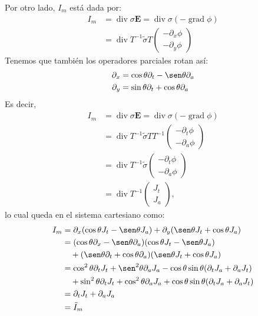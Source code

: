 \documentclass{article}
\newcommand{\EF}{\mathbf{E}}
\DeclareMathOperator{\diver}{div}
\DeclareMathOperator{\grad}{grad}
\begin{document}
Por otro lado, $I_m$ está dada por:
\begin{equation}
\begin{split}
I_m& =\diver \sigma \EF = \diver \sigma (-\grad \phi)\\
& = \diver T^{-1}\tilde{\sigma} T 
\begin{pmatrix}
- \partial_x \phi \\
- \partial_y \phi 
\end{pmatrix}
\end{split}
\end{equation}
Tenemos que también los operadores parciales rotan así:
\begin{align}
\partial_x & =\cos\theta\partial _t - \sen\theta\partial_a \\
\partial_y & =\sin\theta\partial _t +\cos\theta\partial_a
\end{align}
Es decir,
\begin{equation}
\begin{split}
I_m& =\diver \sigma \EF = \diver \sigma (-\grad \phi)\\
& = \diver T^{-1}\tilde{\sigma} T T^{-1} \begin{pmatrix}
-\partial _t \phi\\
-\partial_a \phi
\end{pmatrix}\\
&  = \diver T^{-1}\tilde{\sigma} \begin{pmatrix}
-\partial _t \phi\\
-\partial_a \phi
\end{pmatrix}\\
&  = \diver T^{-1} \begin{pmatrix}
J_t\\
J_a
\end{pmatrix},
\end{split}
\end{equation}
lo cual queda en el sistema cartesiano como:
\begin{equation}
\begin{split}
I_m & =\partial_x (\cos\theta J_t - \sen \theta J_a) + \partial_y (\sen\theta J_t + \cos\theta J_a) \\
&= (\cos\theta \partial_x -\sen\theta \partial_a)(\cos\theta J_t - \sen \theta J_a) \\
 &\quad +
(\sen\theta \partial_t + \cos \theta \partial_a)
(\sen\theta J_t + \cos\theta J_a) \\
&= \cos^2 \theta \partial_t J_t + \sen^2\theta \partial_a J_a 
- \cos\theta\sin\theta(\partial_t J_a +\partial_a J_t )\\
&\quad + 
 \sin^2 \theta \partial_t J_t + \cos^2\theta \partial_a J_a 
+ \cos\theta\sin\theta(\partial_t J_a +\partial_a J_t )\\
&= \partial_t J_t + \partial_a J_a \\
&=\tilde{I}_m
\end{split}
\end{equation}
\end{document}
